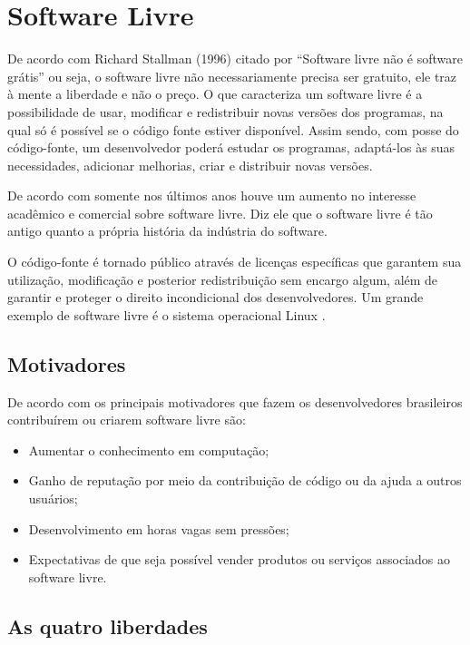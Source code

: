 \section{Software Livre}

De acordo com Richard Stallman (1996) citado por \cite{augusto} “Software livre não é software grátis” ou seja, o software livre não necessariamente precisa ser gratuito, ele traz à mente a liberdade e não o preço. O que caracteriza um software livre é a possibilidade de usar, modificar e redistribuir novas versões dos programas, na qual só é possível se o código fonte estiver disponível. Assim sendo, com posse do código-fonte, um desenvolvedor poderá estudar os programas, adaptá-los às suas necessidades, adicionar melhorias, criar e distribuir novas versões.

De acordo com \cite{augusto} somente nos últimos anos houve um aumento no interesse acadêmico e comercial sobre software livre. Diz ele que o software livre é tão antigo quanto a própria história da indústria do software.

O código-fonte é tornado público através de licenças específicas que garantem sua utilização, modificação e posterior redistribuição sem encargo algum, além de garantir e proteger o direito incondicional dos desenvolvedores. Um grande exemplo de software livre é o sistema operacional Linux \cite{augusto}.

\subsection{Motivadores}

De acordo com \cite{augusto} os principais motivadores que fazem os desenvolvedores brasileiros contribuírem ou criarem software livre são:

\begin{itemize}
  \item Aumentar o conhecimento em computação;
  \item Ganho de reputação por meio da contribuição de código ou da ajuda a outros usuários;
  \item Desenvolvimento em horas vagas sem pressões;
  \item Expectativas de que seja possível vender produtos ou serviços associados ao software livre.
\end{itemize}

\subsection{As quatro liberdades}


